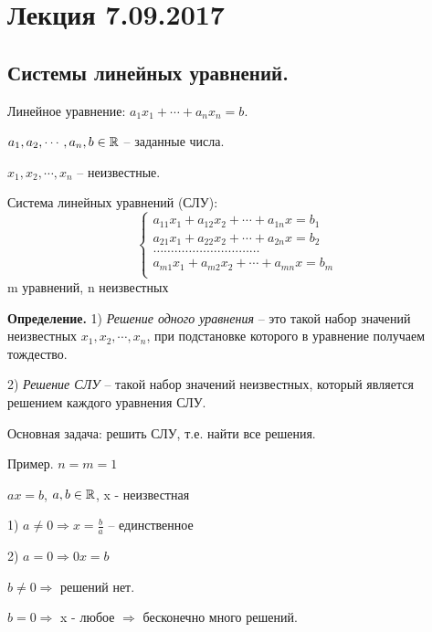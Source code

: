 \section{Лекция 7.09.2017}
\subsection{Системы линейных уравнений.}

Линейное уравнение: $a_1 x_1 + \cdots + a_n x_n = b$.

$a_1, a_2, \cdots, a_n, b \in \mathbb{R}$ -- заданные числа.

$x_1, x_2, \cdots, x_n$ -- неизвестные.

\vspace{\baselineskip}
Система линейных уравнений (СЛУ):
\begin{equation*}
	\left\{
		\begin{aligned}
        a_{11}x_1 + a_{12}x_2 + \cdots + a_{1n}x = b_1 \\
        a_{21}x_1 + a_{22}x_2 + \cdots + a_{2n}x = b_2 \\
        \hdots \hdots \hdots \hdots \hdots \hdots \hdots \hdots \hdots \hdots\\
        a_{m1}x_1 + a_{m2}x_2 + \cdots + a_{mn}x = b_m \\
		\end{aligned}
	\right.
\end{equation*}
m уравнений, n неизвестных

\vspace{\baselineskip}
\textbf{Определение.} 1) \textit{Решение одного уравнения} -- это такой набор значений неизвестных $x_1, x_2, \cdots, x_n$, при подстановке которого в уравнение получаем тождество.

2) \textit{Решение СЛУ} -- такой набор значений неизвестных, который является решением каждого уравнения СЛУ.

\vspace{\baselineskip}
Основная задача: решить СЛУ, т.е. найти все решения.

\vspace{\baselineskip}
Пример. $n = m = 1$

$ax = b$, $a, b \in \mathbb{R}$, x - неизвестная

1) $a \neq 0 \Rightarrow x = \frac{b}{a}$ -- единственное

2) $a = 0 \Rightarrow 0x = b$

$b \neq 0 \Rightarrow$ решений нет.

$b = 0 \Rightarrow$ x - любое $\Rightarrow$ бесконечно много решений.


